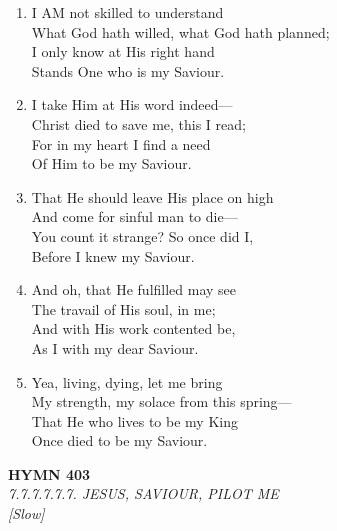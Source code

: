 \documentclass[11pt,a4paper]{article}
\begin{document}
\begin{enumerate}
    \item I AM not skilled to understand \\
        What God hath willed, what God hath planned; \\
        I only know at His right hand \\
        Stands One who is my Saviour.

    \item I take Him at His word indeed--- \\
        Christ died to save me, this I read; \\
        For in my heart I find a need \\
        Of Him to be my Saviour.

    \item That He should leave His place on high \\
        And come for sinful man to die--- \\
        You count it strange? So once did I, \\
        Before I knew my Saviour.

    \item And oh, that He fulfilled may see \\
        The travail of His soul, in me; \\
        And with His work contented be, \\
        As I with my dear Saviour.

    \item Yea, living, dying, let me bring \\
        My strength, my solace from this spring--- \\
        That He who lives to be my King \\
        Once died to be my Saviour.

\end{enumerate}

\newpage
\begin{center}
    {\Large \textbf{HYMN 403}}
    \\
    \textit{7.7.7.7.7.7. JESUS, SAVIOUR, PILOT ME}
    \\
    \textit{\small [Slow]}
\end{center}
\vspace{1em}
\end{document}
